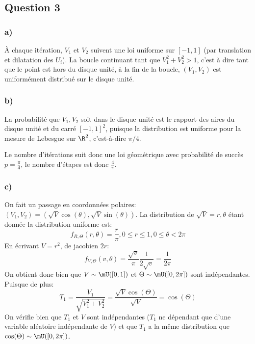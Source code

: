 \documentclass[math, info]{mpb-cours}
\begin{document}
\subsection{Question 3}
\subsubsection{a)}
À chaque itération, $V_{1}$ et $V_{2}$ suivent une loi uniforme sur $[-1, 1]$ (par translation et dilatation des $U_{i}$).
La boucle continuant tant que $V_{1}^{2} + V_{2}^{2} > 1$, c'est à dire tant que le point est hors du disque unité, à la fin de la boucle, $(V_{1}, V_{2})$ est uniformément distribué sur le disque unité.

\subsubsection{b)}
La probabilité que $V_{1}, V_{2}$ soit dans le disque unité est le rapport des aires du disque unité et du carré $[-1, 1]^{2}$, puisque la distribution est uniforme pour la mesure de Lebesgue sur $\R^{2}$, c'est-à-dire $\pi / 4$.

Le nombre d'itérations suit donc une loi géométrique avec probabilité de succès $p = \frac{\pi}{4}$, le nombre d'étapes est donc $\frac{4}{\pi}$.

\subsubsection{c)}
On fait un passage en coordonnées polaires: $(V_{1}, V_{2}) = (\sqrt{V}\cos(\theta), \sqrt{V}\sin(\theta))$.
La distribution de $\sqrt{V} = r, \theta$ étant donnée la distribution uniforme est:
\begin{equation*}
	f_{R, \Theta}(r, \theta) = \frac{r}{\pi}, 0\leq r\leq 1, 0\leq \theta < 2\pi
\end{equation*}
En écrivant $V = r^{2}$, de jacobien $2r$:
\begin{equation*}
	f_{V, \Theta}(v, \theta) = \frac{\sqrt{v}}{\pi}\frac{1}{2\sqrt{v}} = \frac{1}{2\pi}
\end{equation*}
On obtient donc bien que $V \sim \mU([0, 1])$ et $\Theta \sim \mU([0, 2\pi])$ sont indépendantes.
Puisque de plus:
\begin{equation*}
	T_{1} = \frac{V_{1}}{\sqrt{V_{1}^{2} + V_{2}^{2}}} = \frac{\sqrt{V}\cos(\Theta)}{\sqrt{V}} = \cos(\Theta)
\end{equation*}
On vérifie bien que $T_{1}$ et $V$ sont indépendantes ($T_{1}$ ne dépendant que d'une variable aléatoire indépendante de $V$) et que $T_{1}$ a la même distribution que $\cos(\Theta) \sim \mU([0, 2\pi])$.
\end{document}
